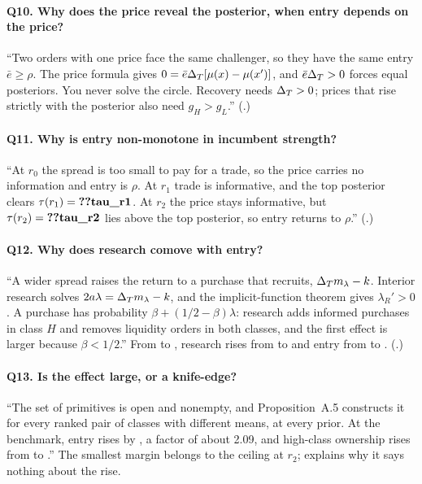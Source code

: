 \paragraph{Q10. Why does the price reveal the posterior, when entry depends on the price?}
``Two orders with one price face the same challenger, so they have the same entry \(\bar e\ge\rho\). The price formula
gives \(0=\bar e\Delta_T[\mu(x)-\mu(x')]\), and \(\bar e\Delta_T>0\) forces equal posteriors. You never solve the circle.
Recovery needs \(\Delta_T>0\); prices that rise strictly with the posterior also need \(g_H>g_L\).''
(.)

\paragraph{Q11. Why is entry non-monotone in incumbent strength?}
``At \(r_0\) the spread is too small to pay for a trade, so the price carries no information and entry is \(\rho\). At
\(r_1\) trade is informative, and the top posterior  clears \(\tau(r_1)=\reg{tau_r1}\). At \(r_2\) the
price stays informative, but \(\tau(r_2)=\reg{tau_r2}\) lies above the top posterior, so entry returns to \(\rho\).''
(.)

\paragraph{Q12. Why does research comove with entry?}
``A wider spread raises the return to a purchase that recruits, \(\Delta_T m_\lambda-k\). Interior research solves
\(2a\lambda=\Delta_T m_\lambda-k\), and the implicit-function theorem gives \(\lambda_R'>0\). A purchase has probability
\(\beta+(1/2-\beta)\lambda\): research adds informed purchases in class \(H\) and removes liquidity orders in both
classes, and the first effect is larger because \(\beta<1/2\).'' From  to , research
rises from  to  and entry from  to
. (.)

\paragraph{Q13. Is the effect large, or a knife-edge?}
``The set of primitives is open and nonempty, and Proposition~A.5 constructs it for every ranked pair of classes
with different means, at every prior. At the benchmark, entry rises by , a factor of about 2.09, %
and high-class ownership rises from  to .'' The smallest margin belongs to the ceiling at
\(r_2\);  explains why it says nothing about the rise.

